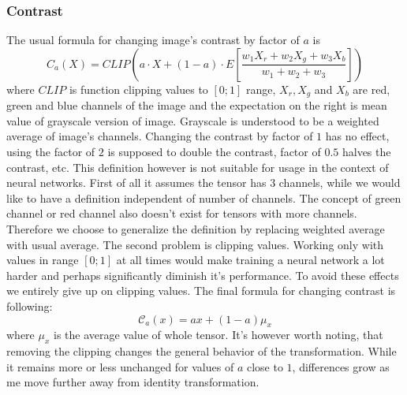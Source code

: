     \subsubsection{Contrast}
    \newcommand\mcc{\mathcal{C}}
        The usual formula for changing image's contrast by factor of $a$ is
        \begin{equation}
            \label{eq:contrast_old}
        C_a(X) = \mathit{CLIP}\left(a\cdot X + (1-a) \cdot E\left[ \frac{w_1X_r
        + w_2X_g + w_3X_b}{w_1+w_2+w_3}\right]   \right)
        \end{equation}
        where
        $\mathit{CLIP}$ is function clipping values to $\left[0;1\right]$ range,
        $X_r, X_g$ and $X_b$ are red, green and blue channels of the image and
        the expectation on the right is mean value of grayscale version of
        image.  Grayscale is understood to be a weighted average of image's
        channels.  Changing the contrast by factor of $1$ has no effect, using
        the factor of $2$ is supposed to double the contrast, factor of $0.5$
        halves the contrast, etc.  This definition however is not suitable for
        usage in the context of neural networks.  First of all it assumes the
        tensor has 3 channels, while we would like to have a definition
        independent of number of channels. The concept of green channel or red
        channel also doesn't exist for tensors with more channels. Therefore we
        choose to generalize the definition by replacing weighted average with
        usual average. The second problem is clipping values. Working only with
        values in range $\left[0;1\right]$ at all times would make training a
        neural network a lot harder and perhaps significantly diminish it's
        performance. To avoid these effects we entirely give up on clipping
        values.  The final formula for changing contrast is following:
        \begin{equation}
            \label{eq:contrast}
            \mathcal{C}_a(x) = ax + (1-a) \mu_x
        \end{equation}
        where $\mu_x$ is the average value of whole tensor. It's however worth
        noting, that removing the clipping changes the general behavior of the
        transformation.  While it remains more or less unchanged for values of
        $a$ close to $1$, differences grow as me move further away from identity
        transformation.

